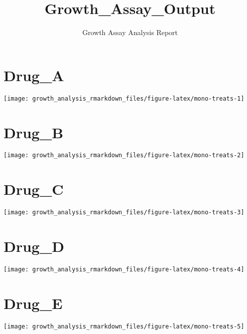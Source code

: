 \documentclass[
  11pt,
]{article}
\title{Growth\_Assay\_Output}
\author{Growth Assay Analysis Report}
\date{}
\begin{document}
\maketitle

\setcounter{footnote}{1}
\setcounter{footnote}{2}

\section{Drug\_A}\label{drug_a}

\begin{center}\texttt{[image: growth\_analysis\_rmarkdown\_files/figure-latex/mono-treats-1]} \end{center}

\section{Drug\_B}\label{drug_b}

\begin{center}\texttt{[image: growth\_analysis\_rmarkdown\_files/figure-latex/mono-treats-2]} \end{center}

\section{Drug\_C}\label{drug_c}

\begin{center}\texttt{[image: growth\_analysis\_rmarkdown\_files/figure-latex/mono-treats-3]} \end{center}

\section{Drug\_D}\label{drug_d}

\begin{center}\texttt{[image: growth\_analysis\_rmarkdown\_files/figure-latex/mono-treats-4]} \end{center}

\section{Drug\_E}\label{drug_e}

\begin{center}\texttt{[image: growth\_analysis\_rmarkdown\_files/figure-latex/mono-treats-5]} \end{center}
\end{document}
